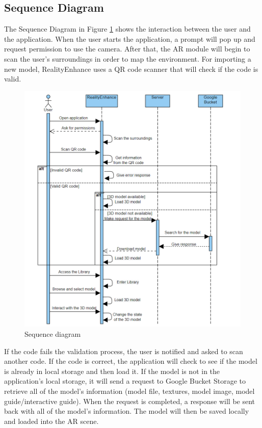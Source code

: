 \subsection*{Sequence Diagram}
The Sequence Diagram in Figure \ref{fig:SequenceDiagram} shows the interaction between the user and the application. When the user starts the application, a prompt will pop up and request permission to use the camera. After that, the \ac{AR} module will begin to scan the user's surroundings in order to map the environment. For importing a new model, RealityEnhance uses a \ac{QR} code scanner that will check if the code is valid.
\begin{figure}[ht]
    \centering
    \includegraphics[width=1\textwidth]{img/SequenceDiagram.png}
    \caption{Sequence diagram}
    \label{fig:SequenceDiagram}
\end{figure}
\newpage

If the code fails the validation process, the user is notified and asked to scan another code. If the code is correct, the application will check to see if the model is already in local storage and then load it. If the model is not in the application's local storage, it will send a request to Google Bucket Storage to retrieve all of the model's information (model file, textures, model image, model guide/interactive guide). When the request is completed, a response will be sent back with all of the model's information. The model will then be saved locally and loaded into the \ac{AR} scene.

